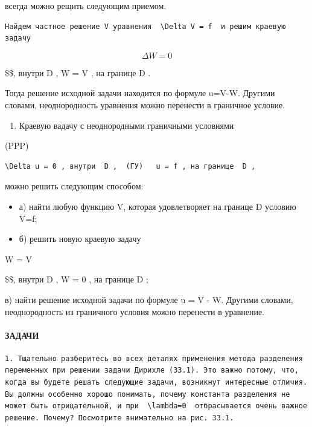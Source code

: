 \documentclass[
  ukrainian,
]{article}
\providecommand{\tightlist}{%
  \setlength{\itemsep}{0pt}\setlength{\parskip}{0pt}}
\begin{document}
всегда можно рещить следующим приемом.

\begin{verbatim}
Найдем частное решение V уравнения  \Delta V = f  и решим краевую задачу
\end{verbatim}

\[
\Delta W = 0
\]

\$\$, внутри D , W = V , на границе D .

Тогда решение исходной задачи находится по формуле u=V-W. Другими
словами, неоднородность уравнения можно перенести в граничное условие.

\begin{enumerate}
\def\labelenumi{\arabic{enumi}.}
\setcounter{enumi}{1}
\tightlist
\item
  Краевую вадачу с неоднородными граничными условиями
\end{enumerate}

(PPP)

\begin{verbatim}
\Delta u = 0 , внутри  D ,  (ГУ)   u = f , на границе  D ,
\end{verbatim}

можно решить следующим способом:

\begin{itemize}
\item
  а) найти любую функцию V, которая удовлетворяет на границе D условию
  V=f;
\item
  б) решить новую краевую задачу
\end{itemize}

 W =  V

\$\$, внутри D , W = 0 , на границе D ;

в) найти решение исходной задачи по формуле u = V - W. Другими словами,
неоднородность из граничного условия можно перенести в уравнение.

\paragraph{ЗАДАЧИ}\label{ux437ux430ux434ux430ux447ux438-8}

\begin{verbatim}
1. Тщательно разберитесь во всех деталях применения метода разделения переменных при решении задачи Дирихле (33.1). Это важно потому, что, когда вы будете решать следующие задачи, возникнут интересные отличия. Вы должны особенно хорошо понимать, почему константа разделения не может быть отрицательной, и при  \lambda=0  отбрасывается очень важное решение. Почему? Посмотрите внимательно на рис. 33.1.
\end{verbatim}
\end{document}
